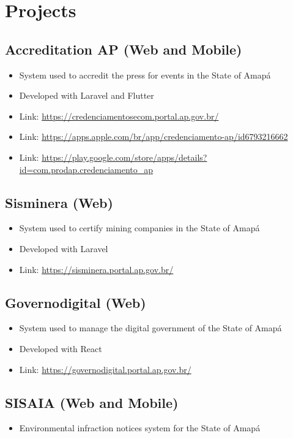\documentclass{article}
\begin{document}
\section{\faFlask\enspace Projects}

\subsection{Accreditation AP (Web and Mobile)}
\begin{itemize}
  \item System used to accredit the press for events in the State of Amapá
  \item Developed with Laravel and Flutter
  \item Link: \url{https://credenciamentosecom.portal.ap.gov.br/}
  \item Link: \url{https://apps.apple.com/br/app/credenciamento-ap/id6793216662}
  \item Link: \url{https://play.google.com/store/apps/details?id=com.prodap.credenciamento_ap}
\end{itemize}

\subsection{Sisminera (Web)}
\begin{itemize}
  \item System used to certify mining companies in the State of Amapá
  \item Developed with Laravel
  \item Link: \url{https://sisminera.portal.ap.gov.br/}
\end{itemize}

\subsection{Governodigital (Web)}
\begin{itemize}
  \item System used to manage the digital government of the State of Amapá
  \item Developed with React
  \item Link: \url{https://governodigital.portal.ap.gov.br/}
\end{itemize}


\subsection{SISAIA (Web and Mobile)}
\begin{itemize}
  \item Environmental infraction notices system for the State of Amapá
\end{itemize}
\end{document}
